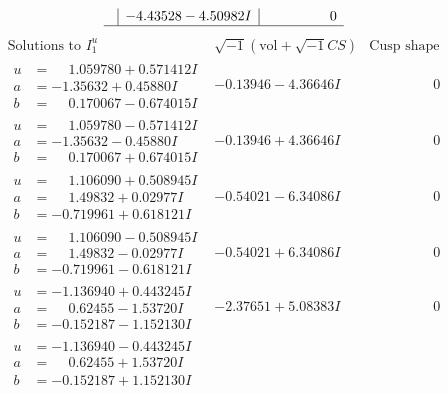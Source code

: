 \documentclass[1p]{elsarticle_modified}
\theoremstyle{definition}
\newcommand{\I}{\sqrt{-1}}
\begin{document}
$$\begin{array}{c|c|c}
 & -4.43528 - 4.50982 I & \phantom{-0.000000 } 0\\
 \hline 
 \end{array}$$\newpage$$\begin{array}{c|c|c}  
\text{Solutions to }I^u_{1}& \I (\text{vol} + \sqrt{-1}CS) & \text{Cusp shape}\\
 \hline 
\begin{aligned}
u &= \phantom{-}1.059780 + 0.571412 I \\
a &= -1.35632 + 0.45880 I \\
b &= \phantom{-}0.170067 - 0.674015 I\end{aligned}
 & -0.13946 - 4.36646 I & \phantom{-0.000000 } 0 \\ \hline\begin{aligned}
u &= \phantom{-}1.059780 - 0.571412 I \\
a &= -1.35632 - 0.45880 I \\
b &= \phantom{-}0.170067 + 0.674015 I\end{aligned}
 & -0.13946 + 4.36646 I & \phantom{-0.000000 } 0 \\ \hline\begin{aligned}
u &= \phantom{-}1.106090 + 0.508945 I \\
a &= \phantom{-}1.49832 + 0.02977 I \\
b &= -0.719961 + 0.618121 I\end{aligned}
 & -0.54021 - 6.34086 I & \phantom{-0.000000 } 0 \\ \hline\begin{aligned}
u &= \phantom{-}1.106090 - 0.508945 I \\
a &= \phantom{-}1.49832 - 0.02977 I \\
b &= -0.719961 - 0.618121 I\end{aligned}
 & -0.54021 + 6.34086 I & \phantom{-0.000000 } 0 \\ \hline\begin{aligned}
u &= -1.136940 + 0.443245 I \\
a &= \phantom{-}0.62455 - 1.53720 I \\
b &= -0.152187 - 1.152130 I\end{aligned}
 & -2.37651 + 5.08383 I & \phantom{-0.000000 } 0 \\ \hline\begin{aligned}
u &= -1.136940 - 0.443245 I \\
a &= \phantom{-}0.62455 + 1.53720 I \\
b &= -0.152187 + 1.152130 I\end{aligned}

\end{array}$$
\end{document}
